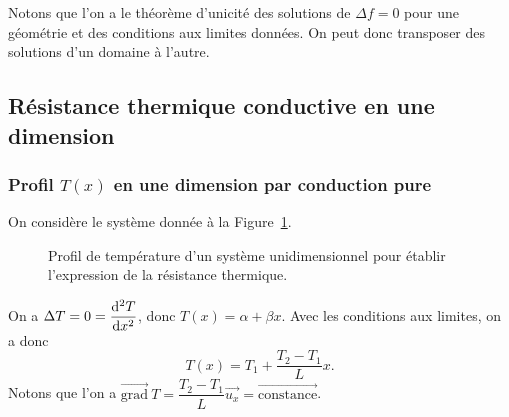         Notons que l'on a le théorème d'unicité des solutions de $\Delta f=0$ pour une géométrie et des conditions aux limites données. On peut donc transposer des solutions d'un domaine à l'autre.

    \subsection{Résistance thermique conductive en une dimension}
        \subsubsection{Profil $T(x)$ en une dimension par conduction pure}

            On considère le système donnée à la Figure~\ref{fig:resistance_thermique_conductive_1d}.
            \begin{figure}
                \centering
                \caption{Profil de température d'un système unidimensionnel pour établir l'expression de la résistance thermique.}    
                \label{fig:resistance_thermique_conductive_1d}
            \end{figure}

            On a $\Delta T=0=\dfrac{\mathrm{d}^{2}T}{\mathrm{d} x^{2}}$, donc $T(x)=\alpha+\beta x$. Avec les conditions aux limites, on a donc
            \begin{equation*}
                T(x)=T_1+\frac{T_2-T_1}{L}x.
            \end{equation*}
            Notons que l'on a $\vec{\mathrm{grad}}~T=\dfrac{T_2-T_1}{L}\vec{u_x}=\vec{\mathrm{constance}}$.

